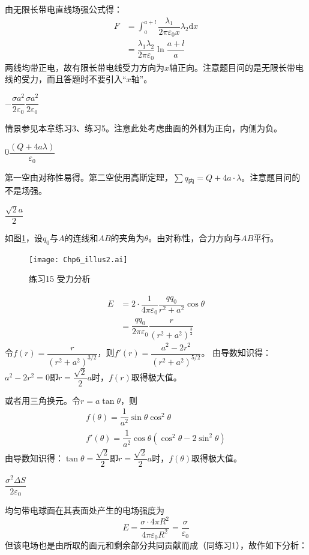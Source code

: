 \documentclass[b5paper,opensource,sourcefont,parskip]{qyxf-book}
\newcommand{\di}[1]{\mathrm{d}#1}
\begin{document}
由无限长带电直线场强公式得：
\begin{align*}
	F&=\int_{a}^{a+l}\dfrac{\lambda_1}{2\pi \varepsilon_0 x}\lambda_2\di{x}\\
	&=\dfrac{\lambda_1\lambda_2}{2\pi \varepsilon_0}\ln\dfrac{a+l}{a}
\end{align*}
两线均带正电，故有限长带电线受力方向为$x$轴正向。注意题目问的是无限长带电线的受力，而且答题时不要引入“$x$轴”。

$-\dfrac{\sigma a^2}{2\varepsilon_0}$\quad$\dfrac{\sigma a^2}{2\varepsilon_0}$

\solve
情景参见本章练习3、练习5。注意此处考虑曲面的外侧为正向，内侧为负。

0\quad $\dfrac{(Q+4a\lambda)}{\varepsilon_0}$

\solve
第一空由对称性易得。第二空使用高斯定理，$\sum q_{\text{内}}=Q+4a\cdot\lambda$。注意题目问的不是场强。

$\dfrac{\sqrt{2}a}{2}$

\solve
如图\ref{fig:c6-t15}，设$q_0$与$A$的连线和$AB$的夹角为$\theta$。由对称性，合力方向与$AB$平行。
\begin{figure}[!htbp]
	\centering
	\texttt{[image: Chp6\_illus2.ai]}
	\caption{练习15 受力分析}\label{fig:c6-t15}
\end{figure}
\begin{align*}
	E&=2\cdot \dfrac{1}{4\pi\varepsilon_0}\dfrac{qq_0}{r^2+a^2}\cos\theta\\
	&=\dfrac{qq_0}{2\pi\varepsilon_0}\dfrac{r}{{(r^2+a^2)}^{\frac{3}{2}}}
\end{align*}
令$f(r)=\dfrac{r}{{(r^2+a^2)}^{3/2}}$，则$f'(r)=\dfrac{a^2-2r^2}{{(r^2+a^2)}^{5/2}}$。
由导数知识得：$a^2-2r^2=0\text{即}r=\dfrac{\sqrt{2}}{2}a$时，$f(r)$取得极大值。

或者用三角换元。令$r=a\tan\theta$，则
\begin{gather*}
	f(\theta)=\dfrac{1}{a^2}\sin\theta\cos^2\theta\\
	f'(\theta)=\dfrac{1}{a^2}\cos\theta(\cos^2\theta-2\sin^2\theta)
\end{gather*}
由导数知识得：$\tan\theta=\dfrac{\sqrt{2}}{2}\text{即}r=\dfrac{\sqrt{2}}{2}a$时，$f(\theta)$取得极大值。

$\dfrac{\sigma^2\Delta S}{2\varepsilon_0}$

\solve
均匀带电球面在其表面处产生的电场强度为
\[
E=\dfrac{\sigma\cdot 4\pi R^2}{4\pi\varepsilon_0R^2}=\dfrac{\sigma}{\varepsilon_0}
\]
但该电场也是由所取的面元和剩余部分共同贡献而成（同练习1），故作如下分析：
\end{document}

